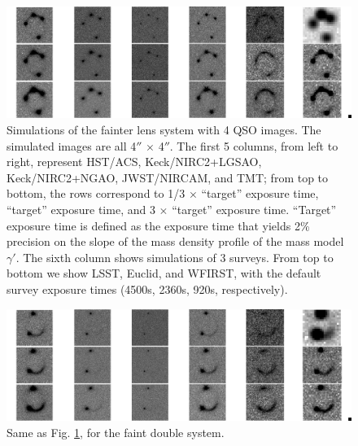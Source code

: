 \documentclass[a4paper,11pt]{article}
\begin{document}
\begin{figure}
\begin{center}
\includegraphics[width=1.0\textwidth]{figures/fainter_system_4QSOimages_all.png}
\end{center}
\caption{Simulations of the fainter lens system with 4 QSO images. The simulated images are all 4$''$ $\times$ 4$''$. The first 5 columns, from left to right, represent HST/ACS, Keck/NIRC2+LGSAO, Keck/NIRC2+NGAO, JWST/NIRCAM, and TMT; from top to bottom, the rows correspond to 1/3 $\times$ ``target'' exposure time, ``target'' exposure time, and 3 $\times$ ``target'' exposure time. ``Target'' exposure time is defined as the exposure time that yields 2\% precision on the slope of the mass density profile of the mass model $\gamma'$. The sixth column shows simulations of 3 surveys. From top to bottom we show LSST, Euclid, and WFIRST, with the default survey exposure times (4500s, 2360s, 920s, respectively).}
\label{fig:fainter_4QSOimages_montage}
\end{figure}


\begin{figure}
\begin{center}
\includegraphics[width=1.0\textwidth]{figures/fainter_system_2QSOimages_all.png}
\end{center}
\caption{Same as Fig. \ref{fig:fainter_4QSOimages_montage}, for the faint double system.}
\label{fig:fainter_2QSOimages_montage}
\end{figure}
\end{document}
